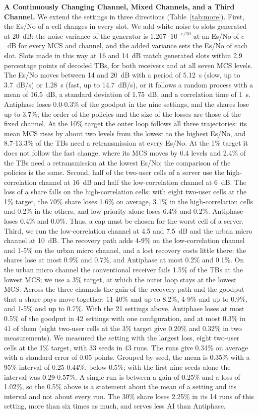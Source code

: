 \documentclass[acmsmall,screen,review,anonymous]{acmart}
\newcommand{\sys}{Antiphase\xspace}
\begin{document}
\noindent\textbf{A Continuously Changing Channel, Mixed Channels, and a Third Channel.} We extend the settings
in three directions (Table~\ref{tab:more}). First, the Es/No of a cell changes in every slot. We add white
noise to slots generated at 20~dB: the noise variance of the generator is $1.267\cdot10^{-e/10}$ at an Es/No
of $e$~dB for every MCS and channel, and the added variance sets the Es/No of each slot. Slots made in this way
at 16 and 14~dB match generated slots within 2.9 percentage points of decoded TBs, for both receivers and at
all seven MCS levels. The Es/No moves between 14 and 20~dB with a period of 5.12~s (slow, up to 3.7~dB/s) or
1.28~s (fast, up to 14.7~dB/s), or it follows a random process with a mean of 16.5~dB, a standard deviation of
1.75~dB, and a correlation time of 1~s. \sys loses 0.0-0.3\% of the goodput in the nine settings, and the
shares lose up to 3.7\%; the order of the policies and the size of the losses are those of the fixed channel.
At the 10\% target the outer loop follows all three trajectories: its mean MCS rises by about two levels from
the lowest to the highest Es/No, and 8.7-13.3\% of the TBs need a retransmission at every Es/No. At the 1\%
target it does not follow the fast change, where its MCS moves by 0.4 levels and 2.4\% of the TBs need a
retransmission at the lowest Es/No; the comparison of the policies is the same. Second, half of the two-user
cells of a server use the high-correlation channel at 16~dB and half the low-correlation channel at 6~dB. The
loss of a share falls on the high-correlation cells: with eight two-user cells at the 1\% target, the 70\%
share loses 1.6\% on average, 3.1\% in the high-correlation cells and 0.2\% in the others, and low priority
alone loses 6.4\% and 0.2\%. \sys loses 0.4\% and 0.0\%. Thus, a cap must be chosen for the worst cell of a
server. Third, we run the low-correlation channel at 4.5 and 7.5~dB and the urban micro channel at 10~dB. The
recovery path adds 4-9\% on the low-correlation channel and 1-5\% on the urban micro channel, and a lost
recovery costs little there: the shares lose at most 0.9\% and 0.7\%, and \sys at most 0.2\% and 0.1\%. On
the urban micro channel the conventional receiver fails 1.5\% of the TBs at the lowest MCS; we use a 3\%
target, at which the outer loop stays at the lowest MCS. Across the three channels the gain of the recovery
path and the goodput that a share pays move together: 11-40\% and up to 8.2\%, 4-9\% and up to 0.9\%, and
1-5\% and up to 0.7\%. With the 21 settings above, \sys loses at most 0.5\% of the goodput in 42 settings with
one configuration, and at most 0.3\% in 41 of them (eight two-user cells at the 3\% target give 0.20\% and
0.32\% in two measurements). We
measured the setting with the largest loss, eight two-user cells at the 1\% target, with 33 seeds in 43 runs.
The runs give 0.34\% on average with a standard error of 0.05 points. Grouped
by seed, the mean is 0.35\% with a 95\% interval of 0.25-0.44\%, below 0.5\%; with the first nine seeds alone the
interval was 0.29-0.57\%. A single run is between a gain of 0.25\% and a loss of 1.02\%, so the 0.5\% above is a
statement about the mean of a setting and its interval and not about every run. The
30\% share loses 2.25\% in its 14 runs of this setting, more than six times as much, and serves less AI than \sys.
\end{document}
